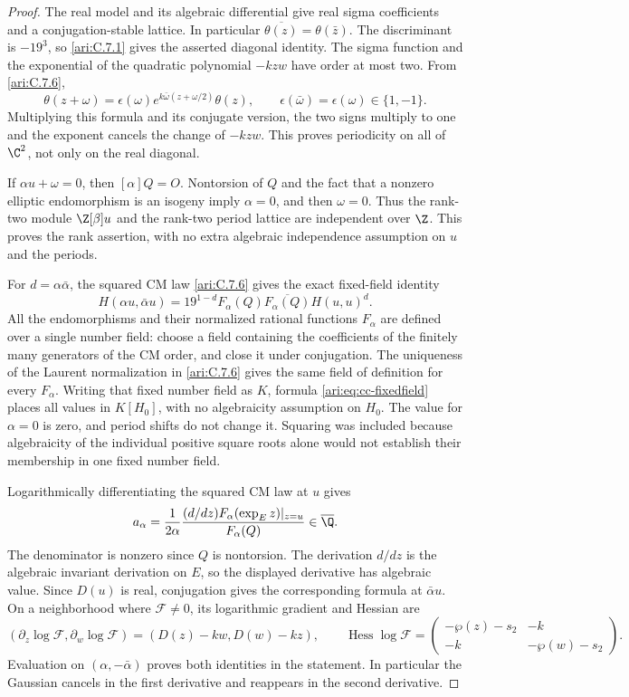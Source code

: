 \begin{proof}
The real model and its algebraic differential give real sigma
coefficients and a conjugation-stable lattice. In particular
$\overline{\theta(z)}=\theta(\bar z)$. The discriminant is
$-19^3$, so \ref{ari:C.7.1} gives the asserted diagonal identity.
The sigma function and the exponential of the quadratic
polynomial $-kzw$ have order at most two. From \ref{ari:C.7.6},
\[
 \theta(z+\omega)=\epsilon(\omega)
         e^{k\bar\omega(z+\omega/2)}\theta(z),
 \qquad \epsilon(\bar\omega)=\epsilon(\omega)\in\{1,-1\}.
\]
Multiplying this formula and its conjugate version, the two
signs multiply to one and the exponent cancels the change of
$-kzw$. This proves periodicity on all of $\C^2$, not only
on the real diagonal.

If $\alpha u+\omega=0$, then $[\alpha]Q=O$.
Nontorsion of $Q$ and the fact that a nonzero elliptic
endomorphism is an isogeny imply $\alpha=0$, and then
$\omega=0$. Thus the rank-two module $\Z[\beta]u$ and the
rank-two period lattice are independent over $\Z$.
This proves the rank assertion, with no extra algebraic
independence assumption on $u$ and the periods.

For $d=\alpha\bar\alpha$, the squared CM law \ref{ari:C.7.6} gives
the exact fixed-field identity
\begin{equation}\label{ari:eq:cc-fixedfield}
 H(\alpha u,\bar\alpha u)
   =19^{1-d}F_\alpha(Q)\overline{F_\alpha(Q)}H(u,u)^d.
\end{equation}
All the endomorphisms and their normalized rational functions
$F_\alpha$ are defined over a single number field: choose
a field containing the coefficients of the finitely many
generators of the CM order, and close it under conjugation.
The uniqueness of the Laurent normalization in \ref{ari:C.7.6} gives
the same field of definition for every $F_\alpha$.
Writing that fixed number field as $K$, formula
\eqref{ari:eq:cc-fixedfield} places all values in $K[H_0]$,
with no algebraicity assumption on $H_0$.
The value for $\alpha=0$ is zero, and period shifts do not
change it. Squaring was included because algebraicity of the
individual positive square roots alone would not establish
their membership in one fixed number field.

Logarithmically differentiating the squared CM law at $u$
gives
\[
 a_\alpha=\frac{1}{2\alpha}
     \frac{(d/dz)F_\alpha(\exp_Ez)|_{z=u}}{F_\alpha(Q)}
                  \in\overline{\Q}.
\]
The denominator is nonzero since $Q$ is nontorsion. The
derivation $d/dz$ is the algebraic invariant derivation on
$E$, so the displayed derivative has algebraic value.
Since $D(u)$ is real, conjugation gives the corresponding
formula at $\bar\alpha u$. On a neighborhood where
$\mathcal F\ne0$, its logarithmic gradient and Hessian are
\[
 (\partial_z\log\mathcal F,\partial_w\log\mathcal F)
       =(D(z)-kw,D(w)-kz),\qquad
 \operatorname{Hess}\log\mathcal F=
 \begin{pmatrix}-\wp(z)-s_2&-k\\-k&-\wp(w)-s_2\end{pmatrix}.
\]
Evaluation on $(\alpha,-\bar\alpha)$ proves both identities
in the statement. In particular the Gaussian cancels in the
first derivative and reappears in the second derivative.


\end{proof}
